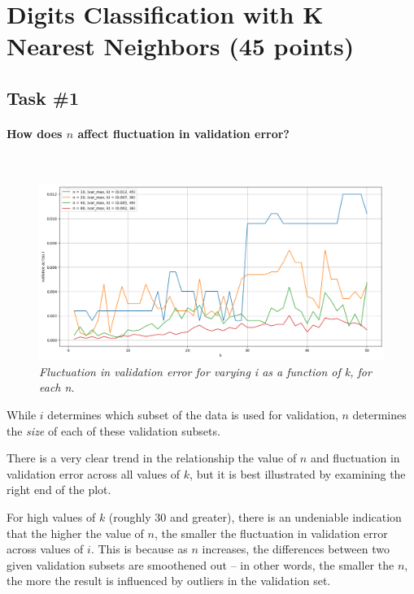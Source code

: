 \newpage
\section{Digits Classification with K Nearest Neighbors (45 points)}

\subsection{Task \#1}

\paragraph{How does $n$ affect fluctuation in validation error?}~\smallskip

\begin{figure}[H]
  \includegraphics[width=\textwidth]{figures/fig2_2.png}
\caption{\footnotesize \it Fluctuation in validation error for varying i as a function of k, for
  each n.}
\label{fig:2-2}
\end{figure}

While $i$ determines which subset of the data is used for validation, $n$
determines the \textit{size} of each of these validation subsets.

There is a very clear trend in the relationship the value of $n$ and fluctuation
in validation error across all values of $k$, but it is best illustrated by
examining the right end of the plot.

For high values of $k$ (roughly 30 and greater), there is an undeniable
indication that the higher the value of $n$, the smaller the fluctuation in
validation error across values of $i$. This is because as $n$ increases, the
differences between two given validation subsets are smoothened out -- in other
words, the smaller the $n$, the more the result is influenced by outliers in the
validation set.


